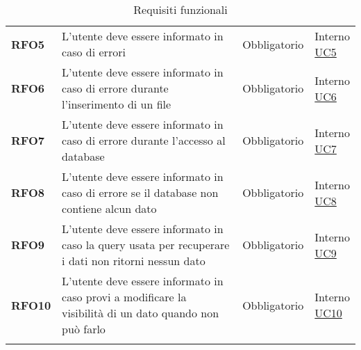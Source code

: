 \begin{longtable}[H]{| >{\raggedright\bfseries}m{20mm} | >{\raggedright}m{90mm} | >{\centering}m{25mm} | >{\centering\arraybackslash}m{30mm}|}
    RFO5
    & L'utente deve essere informato in caso di errori
    & Obbligatorio
    & \makecell{ Interno \\  \hyperref[sub:uc5]{UC5} }\\

    RFO6
    & L'utente deve essere informato in caso di errore durante l'inserimento di un file
    & Obbligatorio
    & \makecell{ Interno \\  \hyperref[sub:uc6]{UC6} }\\

    RFO7
    & L'utente deve essere informato in caso di errore durante l'accesso al database
    & Obbligatorio
    & \makecell{ Interno \\  \hyperref[sub:uc7]{UC7} }\\

    RFO8
    & L'utente deve essere informato in caso di errore se il database non contiene alcun dato
    & Obbligatorio
    & \makecell{ Interno \\  \hyperref[sub:uc8]{UC8} }\\

    RFO9
    & L'utente deve essere informato in caso la query usata per recuperare i dati non ritorni nessun dato
    & Obbligatorio
    & \makecell{ Interno \\  \hyperref[sub:uc9]{UC9} }\\

    RFO10
    & L'utente deve essere informato in caso provi a modificare la visibilità di un dato quando non può farlo
    & Obbligatorio
    & \makecell{ Interno \\  \hyperref[sub:uc10]{UC10} }\\
    \hline
    \rowcolor{white}
    \caption{Requisiti funzionali}%
    \label{tab:requisiti_funzionali}
\end{longtable}

